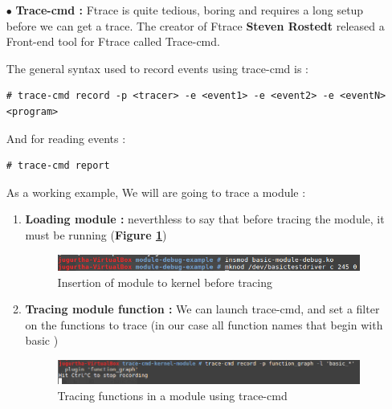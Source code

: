 \begin{itemize}
	\item[$\bullet$] \textbf{Trace-cmd : }
Ftrace is quite tedious, boring and requires a long setup before we can get a trace. The creator of Ftrace \og \textbf{Steven Rostedt} \fg released a Front-end tool for Ftrace called Trace-cmd.	

The general syntax used to record events using trace-cmd is :
	\begin{lstlisting}[style=BashInputStyle]
# trace-cmd record -p <tracer> -e <event1> -e <event2> -e <eventN> <program>
	\end{lstlisting}
	
And for reading events :
	\begin{lstlisting}[style=BashInputStyle]
# trace-cmd report
	\end{lstlisting}	

As a working example, We will are going to trace a module :
\begin{enumerate}
	\item \textbf{Loading module : } neverthless to say that before tracing the module, it must be running (\textbf{Figure \ref{Insertion of module to kernel before tracing}})
		\begin{figure}[H]
			\centering
        	\includegraphics[scale=0.32]{img/solution/insert-your-module-to-kernel.png}
        	\caption{Insertion of module to kernel before tracing}
        	\label{Insertion of module to kernel before tracing}
    	\end{figure}
    		
	\item \textbf{Tracing module function : } We can launch trace-cmd, and set a filter on the functions to trace (in our case all function names that begin with \og basic \fg)
	
		\begin{figure}[H]
			\centering
        	\includegraphics[scale=0.32]{img/solution/trace-cmd-tracing-module.png}
        	\caption{Tracing functions in a module using trace-cmd}
        	\label{Tracing functions in a module using trace-cmd}
    	\end{figure}	
	

\end{enumerate}
\end{itemize}
